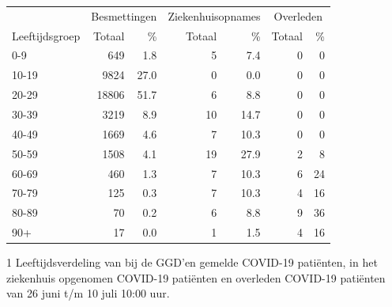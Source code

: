 \documentclass[
  english,
  man,floatsintext]{apa6}
\begin{document}
\begin{table}
\centering\begingroup\fontsize{11}{13}\selectfont

\begin{threeparttable}
\begin{tabular}{lrrrrrr}
\toprule
\multicolumn{1}{c}{ } & \multicolumn{2}{c}{Besmettingen} & \multicolumn{2}{c}{Ziekenhuisopnames} & \multicolumn{2}{c}{Overleden} \\
\cmidrule(l{3pt}r{3pt}){2-3} \cmidrule(l{3pt}r{3pt}){4-5} \cmidrule(l{3pt}r{3pt}){6-7}
Leeftijdsgroep & Totaal & \% & Totaal & \% & Totaal & \%\\
\midrule
0-9 & 649 & 1.8 & 5 & 7.4 & 0 & 0\\
10-19 & 9824 & 27.0 & 0 & 0.0 & 0 & 0\\
20-29 & 18806 & 51.7 & 6 & 8.8 & 0 & 0\\
30-39 & 3219 & 8.9 & 10 & 14.7 & 0 & 0\\
40-49 & 1669 & 4.6 & 7 & 10.3 & 0 & 0\\
50-59 & 1508 & 4.1 & 19 & 27.9 & 2 & 8\\
60-69 & 460 & 1.3 & 7 & 10.3 & 6 & 24\\
70-79 & 125 & 0.3 & 7 & 10.3 & 4 & 16\\
80-89 & 70 & 0.2 & 6 & 8.8 & 9 & 36\\
90+ & 17 & 0.0 & 1 & 1.5 & 4 & 16\\
\bottomrule
\end{tabular}
\begin{tablenotes}
\item[1] Leeftijdsverdeling van bij de GGD’en gemelde COVID-19 patiënten, in het ziekenhuis opgenomen COVID-19 patiënten en overleden COVID-19 patiënten van 26 juni t/m 10 juli 10:00 uur.
\end{tablenotes}
\end{threeparttable}
\endgroup{}
\end{table}

\newpage
\end{document}
